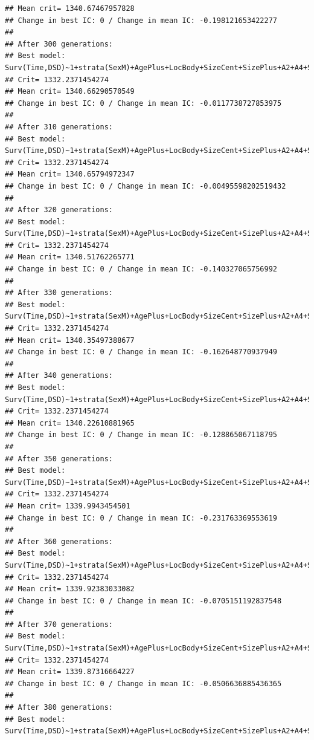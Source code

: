 \documentclass{article}\usepackage[]{graphicx}\usepackage[]{color}
\makeatletter
\newenvironment{kframe}{%
 \def\at@end@of@kframe{}%
 \ifinner\ifhmode%
  \def\at@end@of@kframe{\end{minipage}}%
  \begin{minipage}{\columnwidth}%
 \fi\fi%
 \def\FrameCommand##1{\hskip\@totalleftmargin \hskip-\fboxsep
 \colorbox{shadecolor}{##1}\hskip-\fboxsep
     \hskip-\linewidth \hskip-\@totalleftmargin \hskip\columnwidth}%
 \MakeFramed {\advance\hsize-\width
   \@totalleftmargin\z@ \linewidth\hsize
   \@setminipage}}%
 {\par\unskip\endMakeFramed%
 \at@end@of@kframe}
\newenvironment{knitrout}{}{} %
\makeatother
\begin{document}
\begin{knitrout}
\begin{kframe}
\begin{verbatim}
## Mean crit= 1340.67467957828
## Change in best IC: 0 / Change in mean IC: -0.198121653422277
## 
## After 300 generations:
## Best model: Surv(Time,DSD)~1+strata(SexM)+AgePlus+LocBody+SizeCent+SizePlus+A2+A4+SizeCent:LocBody+A2:SizeCent+strata(SexM):AgePlus+strata(SexM):SizePlus
## Crit= 1332.2371454274
## Mean crit= 1340.66290570549
## Change in best IC: 0 / Change in mean IC: -0.0117738727853975
## 
## After 310 generations:
## Best model: Surv(Time,DSD)~1+strata(SexM)+AgePlus+LocBody+SizeCent+SizePlus+A2+A4+SizeCent:LocBody+A2:SizeCent+strata(SexM):AgePlus+strata(SexM):SizePlus
## Crit= 1332.2371454274
## Mean crit= 1340.65794972347
## Change in best IC: 0 / Change in mean IC: -0.00495598202519432
## 
## After 320 generations:
## Best model: Surv(Time,DSD)~1+strata(SexM)+AgePlus+LocBody+SizeCent+SizePlus+A2+A4+SizeCent:LocBody+A2:SizeCent+strata(SexM):AgePlus+strata(SexM):SizePlus
## Crit= 1332.2371454274
## Mean crit= 1340.51762265771
## Change in best IC: 0 / Change in mean IC: -0.140327065756992
## 
## After 330 generations:
## Best model: Surv(Time,DSD)~1+strata(SexM)+AgePlus+LocBody+SizeCent+SizePlus+A2+A4+SizeCent:LocBody+A2:SizeCent+strata(SexM):AgePlus+strata(SexM):SizePlus
## Crit= 1332.2371454274
## Mean crit= 1340.35497388677
## Change in best IC: 0 / Change in mean IC: -0.162648770937949
## 
## After 340 generations:
## Best model: Surv(Time,DSD)~1+strata(SexM)+AgePlus+LocBody+SizeCent+SizePlus+A2+A4+SizeCent:LocBody+A2:SizeCent+strata(SexM):AgePlus+strata(SexM):SizePlus
## Crit= 1332.2371454274
## Mean crit= 1340.22610881965
## Change in best IC: 0 / Change in mean IC: -0.128865067118795
## 
## After 350 generations:
## Best model: Surv(Time,DSD)~1+strata(SexM)+AgePlus+LocBody+SizeCent+SizePlus+A2+A4+SizeCent:LocBody+A2:SizeCent+strata(SexM):AgePlus+strata(SexM):SizePlus
## Crit= 1332.2371454274
## Mean crit= 1339.9943454501
## Change in best IC: 0 / Change in mean IC: -0.231763369553619
## 
## After 360 generations:
## Best model: Surv(Time,DSD)~1+strata(SexM)+AgePlus+LocBody+SizeCent+SizePlus+A2+A4+SizeCent:LocBody+A2:SizeCent+strata(SexM):AgePlus+strata(SexM):SizePlus
## Crit= 1332.2371454274
## Mean crit= 1339.92383033082
## Change in best IC: 0 / Change in mean IC: -0.0705151192837548
## 
## After 370 generations:
## Best model: Surv(Time,DSD)~1+strata(SexM)+AgePlus+LocBody+SizeCent+SizePlus+A2+A4+SizeCent:LocBody+A2:SizeCent+strata(SexM):AgePlus+strata(SexM):SizePlus
## Crit= 1332.2371454274
## Mean crit= 1339.87316664227
## Change in best IC: 0 / Change in mean IC: -0.0506636885436365
## 
## After 380 generations:
## Best model: Surv(Time,DSD)~1+strata(SexM)+AgePlus+LocBody+SizeCent+SizePlus+A2+A4+SizeCent:LocBody+A2:SizeCent+strata(SexM):AgePlus+strata(SexM):SizePlus

\end{verbatim}
\end{kframe}
\end{knitrout}
\end{document}
